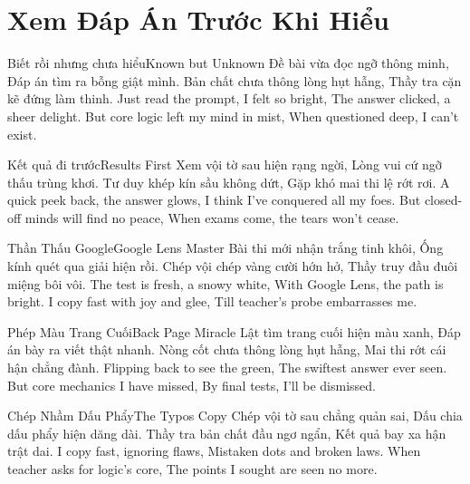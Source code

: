 \chapter{Xem Đáp Án Trước Khi Hiểu}

\begin{tutuyetbox}{Biết rồi nhưng chưa hiểu}{Known but Unknown}
Đề bài vừa đọc ngỡ thông minh,
Đáp án tìm ra bỗng giật mình.
Bản chất chưa thông lòng hụt hẫng,
Thầy tra cặn kẽ đứng làm thinh.
\tcblower
Just read the prompt, I felt so bright,
The answer clicked, a sheer delight.
But core logic left my mind in mist,
When questioned deep, I can't exist.
\end{tutuyetbox}

\begin{tutuyetbox}{Kết quả đi trước}{Results First}
Xem vội tờ sau hiện rạng ngời,
Lòng vui cứ ngỡ thấu trùng khơi.
Tư duy khép kín sầu không dứt,
Gặp khó mai thi lệ rớt rơi.
\tcblower
A quick peek back, the answer glows,
I think I've conquered all my foes.
But closed-off minds will find no peace,
When exams come, the tears won't cease.
\end{tutuyetbox}

\begin{tutuyetbox}{Thần Thấu Google}{Google Lens Master}
Bài thi mới nhận trắng tinh khôi,
Ống kính quét qua giải hiện rồi.
Chép vội chép vàng cười hớn hở,
Thầy truy đầu đuôi miệng bôi vôi.
\tcblower
The test is fresh, a snowy white,
With Google Lens, the path is bright.
I copy fast with joy and glee,
Till teacher's probe embarrasses me.
\end{tutuyetbox}

\begin{tutuyetbox}{Phép Màu Trang Cuối}{Back Page Miracle}
Lật tìm trang cuối hiện màu xanh,
Đáp án bày ra viết thật nhanh.
Nòng cốt chưa thông lòng hụt hẫng,
Mai thi rớt cái hận chẳng đành.
\tcblower
Flipping back to see the green,
The swiftest answer ever seen.
But core mechanics I have missed,
By final tests, I'll be dismissed.
\end{tutuyetbox}

\begin{tutuyetbox}{Chép Nhầm Dấu Phẩy}{The Typos Copy}
Chép vội tờ sau chẳng quản sai,
Dấu chia dấu phẩy hiện dăng dài.
Thầy tra bản chất đầu ngơ ngẩn,
Kết quả bay xa hận trật dai.
\tcblower
I copy fast, ignoring flaws,
Mistaken dots and broken laws.
When teacher asks for logic's core,
The points I sought are seen no more.
\end{tutuyetbox}


